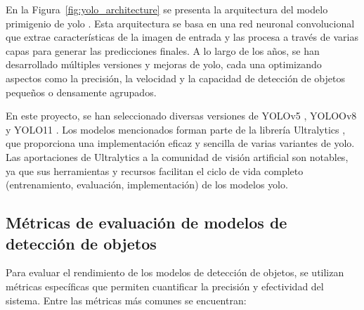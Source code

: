 \documentclass[11pt,spanish,listoffigures,listoftables]{tfgetsinf}
\begin{document}
En la Figura~\ref{fig:yolo_architecture} se presenta la arquitectura del modelo primigenio de \gls{yolo} \cite{redmon2016lookonceunifiedrealtime}. Esta arquitectura se basa en una red neuronal convolucional que extrae características de la imagen de entrada y las procesa a través de varias capas para generar las predicciones finales. A lo largo de los años, se han desarrollado múltiples versiones y mejoras de \gls{yolo}, cada una optimizando aspectos como la precisión, la velocidad y la capacidad de detección de objetos pequeños o densamente agrupados.

En este proyecto, se han seleccionado diversas versiones de YOLOv5 \cite{yolov5_ultralytics}, YOLOOv8 \cite{yolov8_ultralytics} y YOLO11 \cite{yolo11_ultralytics}. Los modelos mencionados forman parte de la librería Ultralytics \cite{Jocher_Ultralytics_YOLO_2023}, que proporciona una implementación eficaz y sencilla de varias variantes de \gls{yolo}. Las aportaciones de Ultralytics a la comunidad de visión artificial son notables, ya que sus herramientas y recursos facilitan el ciclo de vida completo (entrenamiento, evaluación, implementación) de los modelos \gls{yolo}.

\subsection{Métricas de evaluación de modelos de detección de objetos} \label{sec:metricas_evaluacion}

Para evaluar el rendimiento de los modelos de detección de objetos, se utilizan métricas específicas que permiten cuantificar la precisión y efectividad del sistema. Entre las métricas más comunes se encuentran:
\end{document}
